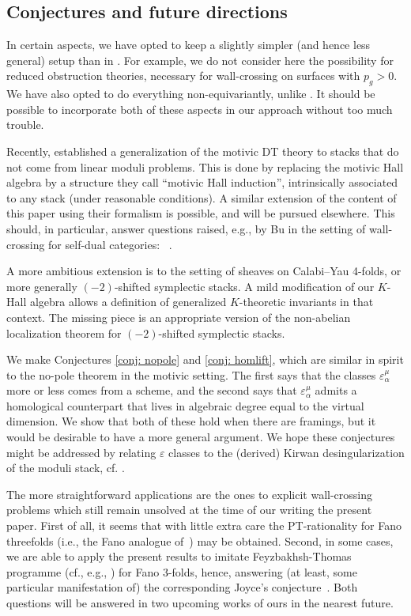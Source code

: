 \documentclass[12pt]{amsart}
\theoremstyle{definition}
\newcommand{\1}{\mathbf 1}
\begin{document}
\subsection{Conjectures and future directions}In certain aspects, we have opted to keep a slightly simpler (and hence less general) setup than in \cite{joyce}. For example, we do not consider here the possibility for reduced obstruction theories, necessary for wall-crossing on surfaces with $p_g>0$. We have also opted to do everything non-equivariantly, unlike \cite{Liu}. It should be possible to incorporate both of these aspects in our approach without too much trouble. 

Recently, \cite{intrinsicDT1, intrinsicDT2} established a generalization of the motivic DT theory to stacks that do not come from linear moduli problems. This is done by replacing the motivic Hall algebra by a structure they call ``motivic Hall induction'', intrinsically associated to any stack (under reasonable conditions). A similar extension of the content of this paper using their formalism is possible, and will be pursued elsewhere. This should, in particular, answer questions raised, e.g., by Bu in the setting of wall-crossing for self-dual categories: ~\cite{Bu1}.

A more ambitious extension is to the setting of sheaves on Calabi--Yau 4-folds, or more generally $(-2)$-shifted symplectic stacks. A mild modification of our $K$-Hall algebra allows a definition of generalized $K$-theoretic invariants in that context. The missing piece is an appropriate version of the non-abelian localization theorem for $(-2)$-shifted symplectic stacks.

We make Conjectures \ref{conj: nopole} and \ref{conj: homlift}, which are similar in spirit to the no-pole theorem in the motivic setting. The first says that the classes $\varepsilon_\alpha^\mu$ more or less comes from a scheme, and the second says that $\varepsilon_\alpha^\mu$ admits a homological counterpart that lives in algebraic degree equal to the virtual dimension. We show that both of these hold when there are framings, but it would be desirable to have a more general argument. We hope these conjectures might be addressed by relating $\varepsilon$ classes to the (derived) Kirwan desingularization of the moduli stack, cf. \cite{HRS}.

The more straightforward applications are the ones to explicit wall-crossing problems which still remain unsolved at the time of our writing the present paper. First of all, it seems that with little extra care the PT-rationality for Fano threefolds (i.e., the Fano analogue of~\cite{todaPTrationality}) may be obtained. Second, in some cases, we are able to apply the present results to imitate Feyzbakhsh-Thomas programme (cf., e.g., \cite{FTr0}) for Fano $3$-folds, hence, answering (at least, some particular manifestation of) the corresponding Joyce's conjecture~\cite[p.14]{Joycepres}. Both questions will be answered in two upcoming works of ours in the nearest future.
\end{document}
